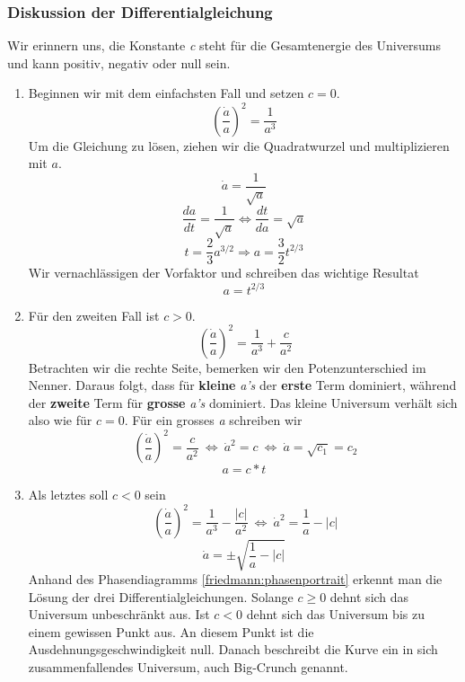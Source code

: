 \begin{refsection}
\subsubsection{Diskussion der Differentialgleichung}
Wir erinnern uns, die Konstante \textit{c} steht für die Gesamtenergie des Universums und kann positiv, negativ oder null sein.
\begin{enumerate}
	\item Beginnen wir mit dem einfachsten Fall und setzen $c = 0$.
	\[\left(\frac{\dot{a}}{a} \right)^2 = \frac{1}{a^3}\]
	Um die Gleichung zu lösen, ziehen wir die Quadratwurzel und multiplizieren mit $a$.
	\[ \dot{a} = \frac{1}{\sqrt{a}} \]
	\[\frac{da}{dt} =\frac{1}{\sqrt{a}} \Leftrightarrow \frac{dt}{da} = \sqrt{a} \]
	\[ t = \frac{2}{3} a^{3/2} \Rightarrow a = \frac{3}{2} t^{2/3} \]
	Wir vernachlässigen der Vorfaktor und schreiben das wichtige Resultat
	\begin{equation}
	a = t^{2/3}
	\end{equation}
	
	\item Für den zweiten Fall ist $c > 0$.
	\[\ \left(\frac{\dot{a}}{a} \right)^2 = \frac{1}{a^3} + \frac{c}{a^2}\]
	Betrachten wir die rechte Seite, bemerken wir den Potenzunterschied im Nenner. Daraus folgt, dass für \textbf{kleine} \textit{a's} der \textbf{erste} Term dominiert, während der \textbf{zweite} Term für \textbf{grosse} \textit{a's} dominiert. Das kleine Universum verhält sich also wie für $c = 0$. Für ein grosses \textit{a} schreiben wir
	\[\ \left(\frac{\dot{a}}{a} \right)^2 = \frac{c}{a^2} \: \Leftrightarrow \:	\dot{a}^2 = c \: \Leftrightarrow \: \dot{a} = \sqrt{c_1} = c_2\]
	\begin{equation}
	a = c*t
	\label{friedmann:LoesungZweiterTerm}
	\end{equation}
	
	\item Als letztes soll $c < 0$ sein
	\[\ \left(\frac{\dot{a}}{a} \right)^2 = \frac{1}{a^3} - \frac{|c|}{a^2} \: \Leftrightarrow \: \dot{a}^2 = \frac{1}{a} - |c|\]
	\begin{equation}
	\dot{a} = \pm \sqrt{\frac{1}{a} - |c|}
	\end{equation}
	Anhand des Phasendiagramms \ref{friedmann:phasenportrait} erkennt man die Lösung der drei Differentialgleichungen. Solange $c \geq 0$ dehnt sich das Universum unbeschränkt aus. Ist $c < 0$ dehnt sich das Universum bis zu einem gewissen Punkt aus. An diesem Punkt ist die Ausdehnungsgeschwindigkeit null. Danach beschreibt die Kurve ein in sich zusammenfallendes Universum, auch Big-Crunch genannt.
	

\end{enumerate}
\end{refsection}
